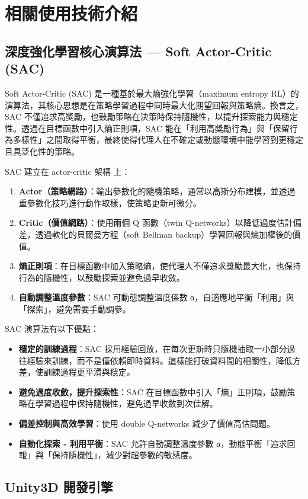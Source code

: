 \documentclass[12pt,a4paper]{ctexart}
\begin{document}
\section{相關使用技術介紹}
\subsection{深度強化學習核心演算法 — Soft Actor-Critic (SAC)}
Soft Actor-Critic (SAC) 是一種基於最大熵強化學習（maximum entropy RL）的演算法，其核心思想是在策略學習過程中同時最大化期望回報與策略熵。換言之，SAC 不僅追求高獎勵，也鼓勵策略在決策時保持隨機性，以提升探索能力與穩定性。透過在目標函數中引入熵正則項，SAC 能在「利用高獎勵行為」與「保留行為多樣性」之間取得平衡，最終使得代理人在不確定或動態環境中能學習到更穩定且具泛化性的策略。
\\ \par
SAC 建立在 actor-critic 架構 上：
\begin{enumerate}
	\item \textbf{Actor（策略網路）}：輸出參數化的隨機策略，通常以高斯分布建模，並透過重參數化技巧進行動作取樣，使策略更新可微分。
	\item \textbf{Critic（價值網路）}：使用兩個 Q 函數（twin Q-networks）以降低過度估計偏差，透過軟化的貝爾曼方程（soft Bellman backup）學習回報與熵加權後的價值。
	\item \textbf{熵正則項}：在目標函數中加入策略熵，使代理人不僅追求獎勵最大化，也保持行為的隨機性，以鼓勵探索並避免過早收斂。
	\item \textbf{自動調整溫度參數}：SAC 可動態調整溫度係數 α，自適應地平衡「利用」與「探索」，避免需要手動調參。
\end{enumerate}

SAC 演算法有以下優點：
\begin{itemize}
	\item \textbf{穩定的訓練過程}：SAC 採用經驗回放，在每次更新時只隨機抽取一小部分過往經驗來訓練，而不是僅依賴即時資料。這樣能打破資料間的相關性，降低方差，使訓練過程更平滑與穩定。
	\item \textbf{避免過度收斂，提升探索性}：SAC 在目標函數中引入「熵」正則項，鼓勵策略在學習過程中保持隨機性，避免過早收斂到次佳解。
	\item \textbf{偏差控制與高效學習}：使用 double Q-networks 減少了價值高估問題。
	\item \textbf{自動化探索 - 利用平衡}：SAC 允許自動調整溫度參數 α，動態平衡「追求回報」與「保持隨機性」，減少對超參數的敏感度。
\end{itemize}

\subsection{Unity3D 開發引擎}
\end{document}
